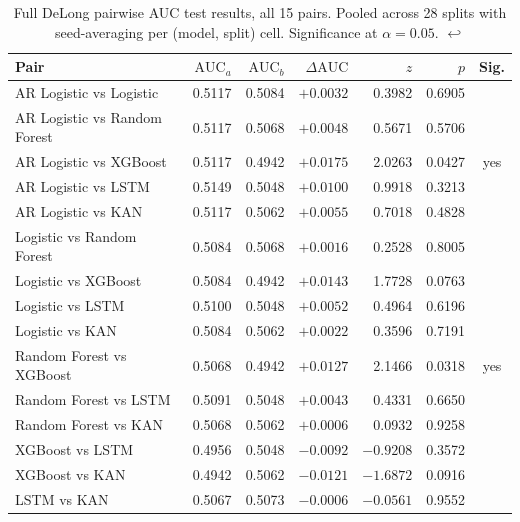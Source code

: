 \documentclass[11pt,a4paper,oneside]{article}
\begin{document}
\begin{table}[H]
\centering
\scriptsize
\setlength{\tabcolsep}{4pt}
\renewcommand{\arraystretch}{0.9}
\begin{tabular}{lrrrrrc}
\toprule
Pair & $\text{AUC}_a$ & $\text{AUC}_b$ & $\Delta \text{AUC}$ & $z$ & $p$ & Sig. \\
\midrule
AR Logistic vs Logistic         & 0.5117 & 0.5084 & $+0.0032$ &  0.3982 & 0.6905 & \\
AR Logistic vs Random Forest    & 0.5117 & 0.5068 & $+0.0048$ &  0.5671 & 0.5706 & \\
AR Logistic vs XGBoost          & 0.5117 & 0.4942 & $+0.0175$ &  2.0263 & 0.0427 & yes \\
AR Logistic vs LSTM             & 0.5149 & 0.5048 & $+0.0100$ &  0.9918 & 0.3213 & \\
AR Logistic vs KAN              & 0.5117 & 0.5062 & $+0.0055$ &  0.7018 & 0.4828 & \\
Logistic vs Random Forest       & 0.5084 & 0.5068 & $+0.0016$ &  0.2528 & 0.8005 & \\
Logistic vs XGBoost             & 0.5084 & 0.4942 & $+0.0143$ &  1.7728 & 0.0763 & \\
Logistic vs LSTM                & 0.5100 & 0.5048 & $+0.0052$ &  0.4964 & 0.6196 & \\
Logistic vs KAN                 & 0.5084 & 0.5062 & $+0.0022$ &  0.3596 & 0.7191 & \\
Random Forest vs XGBoost        & 0.5068 & 0.4942 & $+0.0127$ &  2.1466 & 0.0318 & yes \\
Random Forest vs LSTM           & 0.5091 & 0.5048 & $+0.0043$ &  0.4331 & 0.6650 & \\
Random Forest vs KAN            & 0.5068 & 0.5062 & $+0.0006$ &  0.0932 & 0.9258 & \\
XGBoost vs LSTM                 & 0.4956 & 0.5048 & $-0.0092$ & $-0.9208$ & 0.3572 & \\
XGBoost vs KAN                  & 0.4942 & 0.5062 & $-0.0121$ & $-1.6872$ & 0.0916 & \\
LSTM vs KAN                     & 0.5067 & 0.5073 & $-0.0006$ & $-0.0561$ & 0.9552 & \\
\bottomrule
\end{tabular}
\caption{Full DeLong pairwise AUC test results, all 15 pairs. Pooled across 28 splits with seed-averaging per (model, split) cell. Significance at $\alpha = 0.05$. \hyperref[ref:delong_pairs_full_call]{$\hookleftarrow$}}
\label{tab:delong_pairs_full}
\end{table}
\end{document}
